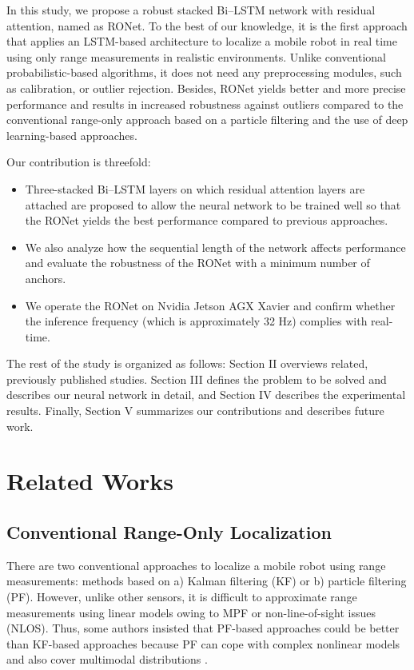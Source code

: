 \documentclass[letterpaper, 10 pt, conference]{ieeeconf}
\begin{document}
In this study, we propose a robust stacked Bi--LSTM network with residual attention, named as RONet. To the best of our knowledge, it is the first approach that applies an LSTM-based architecture to localize a mobile robot in real time using only range measurements in realistic environments. Unlike conventional probabilistic-based algorithms, it does not need any preprocessing modules, such as calibration, or outlier rejection. Besides, RONet yields better and more precise performance and results in increased robustness against outliers compared to the conventional range-only approach based on a particle filtering and the use of deep learning-based approaches.

Our contribution is threefold:
\begin{itemize}
	\item Three-stacked Bi--LSTM layers on which residual attention layers are attached are proposed to allow the neural network to be trained well so that the RONet yields the best performance compared to previous approaches.
	\item We also analyze how the sequential length of the network affects performance and evaluate the robustness of the RONet with a minimum number of anchors.
	\item We operate the RONet on Nvidia Jetson AGX Xavier and confirm whether the inference frequency (which is approximately 32 Hz) complies with real-time. 
\end{itemize}

The rest of the study is organized as follows: Section II overviews related, previously published studies. Section III defines the problem to be solved and describes our neural network in detail, and Section IV describes the experimental results. Finally, Section V summarizes our contributions and describes future work.

\section{Related Works}
\subsection{Conventional Range-Only Localization}

There are two conventional approaches to localize a mobile robot using range measurements: methods based on a) Kalman filtering (KF) or b) particle filtering (PF). However, unlike other sensors, it is difficult to approximate range measurements using linear models owing to MPF or non-line-of-sight issues (NLOS). Thus, some authors insisted that PF-based approaches could be better than KF-based approaches because PF can cope with complex nonlinear models and also cover multimodal distributions \cite{gonzalez2009mobile, blanco2008pure, shetty2018particle}. 
\end{document}
